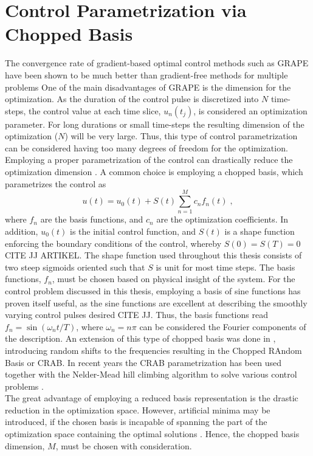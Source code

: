 \section{Control Parametrization via Chopped Basis} \label{sec:GROUP}
The convergence rate of gradient-based optimal control methods such as GRAPE have been shown to be much better than gradient-free methods for multiple problems \cite{Jager2014, JJ}
One of the main disadvantages of GRAPE is the dimension for the optimization. As the duration of the control pulse is discretized into $N$ time-steps, the control value at each time slice, $u_n (t_j)$, is considered an optimization parameter. For long durations or small time-steps the resulting dimension of the optimization ($N$) will be very large. Thus, this type of control parametrization can be considered having too many degrees of freedom for the optimization.\\
Employing a proper parametrization of the control can drastically reduce the optimization dimension \cite{Winckel2008}.
A common choice is employing a chopped basis, which parametrizes the control as
\begin{equation}
	u(t) = u_0 (t) + S(t) \sum_{n=1}^{M} c_n f_n (t) \; , \label{eq:controlParametrization}
\end{equation}   
where $f_n$ are the basis functions, and $c_n$ are the optimization coefficients. In addition, $u_0 (t)$ is the initial control function, and $S (t)$ is a shape function enforcing the boundary conditions of the control, whereby $S(0) = S(T) = 0$ CITE JJ ARTIKEL. The shape function used throughout this thesis consists of two steep sigmoids oriented such that $S$ is unit for most time steps. The basis functions, $f_n$, must be chosen based on physical insight of the system. For the control problem discussed in this thesis, employing a basis of sine functions has proven itself useful, as the sine functions are excellent at describing the smoothly varying control pulses desired CITE JJ. Thus, the basis functions read $f_n = \sin \left( \omega_n t / T \right)$, where $\omega_n = n \pi$ can be considered the Fourier components of the description.
An extension of this type of chopped basis was done in \cite{Doria2011,Caneva2011crab}, introducing random shifts to the frequencies resulting in the Chopped RAndom Basis or \textsc{CRAB}. In recent years the \textsc{CRAB} parametrization has been used together with the Nelder-Mead hill climbing algorithm to solve various control problems \cite{Doria2011,Caneva2011,FrankBloch,Lloyd2014}.\\
The great advantage of employing a reduced basis representation is the drastic reduction in the optimization space. However, artificial minima may be introduced, if the chosen basis is incapable of spanning the part of the optimization space containing the optimal solutions \cite{Rach2015}. Hence, the chopped basis dimension, $M$, must be chosen with consideration.


